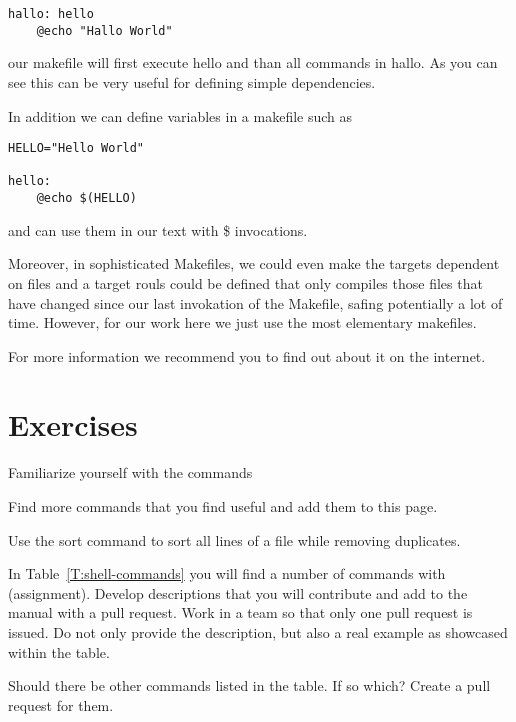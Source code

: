 \begin{lstlisting} 
hallo: hello
    @echo "Hallo World"
\end{lstlisting} 

our makefile will first execute hello and than all commands in hallo.
As you can see this can be very useful for defining simple
dependencies. 

In addition we can define variables in a makefile such as 

\begin{lstlisting} 
HELLO="Hello World"

hello: 
    @echo $(HELLO)
\end{lstlisting} 

and can use them in our text with \$ invocations.

Moreover, in sophisticated Makefiles, we could even make the targets
dependent on files and a target rouls could be defined that only
compiles those files that have changed since our last invokation of
the Makefile, safing potentially a lot of time. However, for our work
here we just use the most elementary makefiles.

For more information we recommend you to find out about it on the internet.


\section{Exercises}

\begin{exercise}
\label{E:Linux.1}
Familiarize yourself with the commands
\end{exercise}

\begin{exercise}
\label{E:Linux.2}
Find more commands that you find useful and add them to this page.
\end{exercise}

\begin{exercise}
\label{E:Linux.3}
Use the sort command to sort all lines of a file while removing
duplicates.
\end{exercise}

\begin{exercise}
\label{E:Linux.4} In Table~\ref{T:shell-commands} you will find a number
  of commands with (assignment). Develop descriptions that you will
  contribute and add to the manual with a pull request. Work in a team
  so that only one pull request is issued. Do not only provide the
  description, but also a real example as showcased within the table.
\end{exercise}

\begin{exercise}
\label{E:Linux.4} Should there be other commands listed in the table. If
  so which? Create a pull request for them. 
\end{exercise}


\